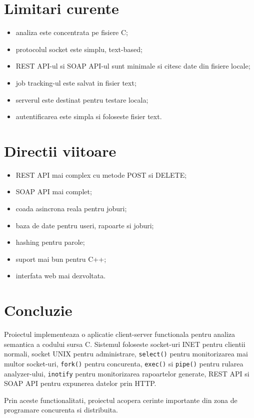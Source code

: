 \documentclass[12pt,a4paper]{article}
\begin{document}
\section{Limitari curente}

\begin{itemize}
    \item analiza este concentrata pe fisiere C;
    \item protocolul socket este simplu, text-based;
    \item REST API-ul si SOAP API-ul sunt minimale si citesc date din fisiere locale;
    \item job tracking-ul este salvat in fisier text;
    \item serverul este destinat pentru testare locala;
    \item autentificarea este simpla si foloseste fisier text.
\end{itemize}

\section{Directii viitoare}

\begin{itemize}
    \item REST API mai complex cu metode POST si DELETE;
    \item SOAP API mai complet;
    \item coada asincrona reala pentru joburi;
    \item baza de date pentru useri, rapoarte si joburi;
    \item hashing pentru parole;
    \item suport mai bun pentru C++;
    \item interfata web mai dezvoltata.
\end{itemize}

\section{Concluzie}

Proiectul implementeaza o aplicatie client-server functionala pentru analiza semantica a codului sursa C. Sistemul foloseste socket-uri INET pentru clientii normali, socket UNIX pentru administrare, \texttt{select()} pentru monitorizarea mai multor socket-uri, \texttt{fork()} pentru concurenta, \texttt{exec()} si \texttt{pipe()} pentru rularea analyzer-ului, \texttt{inotify} pentru monitorizarea rapoartelor generate, REST API si SOAP API pentru expunerea datelor prin HTTP.

Prin aceste functionalitati, proiectul acopera cerinte importante din zona de programare concurenta si distribuita.
\end{document}

